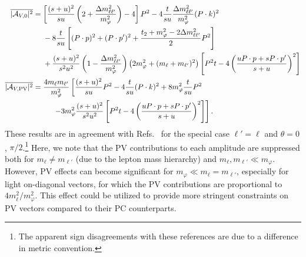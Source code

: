 \begin{align}
    \overline{|{\cal A}_{V,0}|^2} &= \left[\frac{(s+u)^2}{su}\left(2+\frac{\Delta m_{\ell\ell'}^2}{m_\varphi^2}\right) - 4\right]P^2 - 4\frac{t}{su}\frac{\Delta m_{\ell\ell'}^2}{m_\varphi^2}(P\cdot k)^2\nonumber\\
    &\ \ \ \ - 8\frac{t}{su}\left[(P\cdot p)^2 + (P\cdot p')^2 +\frac{t_2+m_{\varphi}^2-2\Delta m_{\ell\ell'}^2}{2}P^2\right]\nonumber \\ & \ \ \ \ + \frac{(s+u)^2}{s^2u^2}\left(1 - \frac{\Delta m_{\ell\ell'}^2}{m_\varphi^2}\right)\left(2m_{\varphi}^2 + (m_\ell + m_{\ell'})^2\right)\left[P^2t - 4\left(\frac{uP\cdot p + sP\cdot p'}{s+u}\right)^2\right] \nonumber\\
    \overline{|{\cal A}_{V,{\rm PV}}|^2} &= \frac{4m_{\ell}m_{\ell'}}{m_{\varphi}^2}\left[\frac{(s+u)^2}{su} P^2 - 4\frac{t}{su}(P\cdot k)^2 + 8m_{\varphi}^2\frac{t}{su}P^2\right.\nonumber\\
    &\ \ \ \ \ \ \ \ \left. - 3m_{\varphi}^2\frac{(s+u)^2}{s^2u^2}\left[P^2t - 4\left(\frac{uP\cdot p + sP\cdot p'}{s+u}\right)^2\right]\right].\label{eq:vector_amplitudes}
\end{align}
These results are in agreement with Refs.~\cite{Liu:2016mqv,Liu:2017htz} for the special case $\ell' = \ell$ and $\theta = 0$, $\pi/2$.\footnote{The apparent sign disagreements with these references are due to a difference in metric convention.} Here, we note that the PV contributions to each amplitude are suppressed both for $m_\ell \neq m_{\ell'}$ (due to the lepton mass hierarchy) and $m_\ell,m_{\ell'} \ll m_\varphi$. However, PV effects can become significant for $m_\varphi \ll m_\ell = m_{\ell'}$, especially for light on-diagonal vectors, for which the PV contributions are proportional to $4m_\ell^2/m_\varphi^2$. This effect could be utilized to provide more stringent constraints on PV vectors compared to their PC counterparts.

